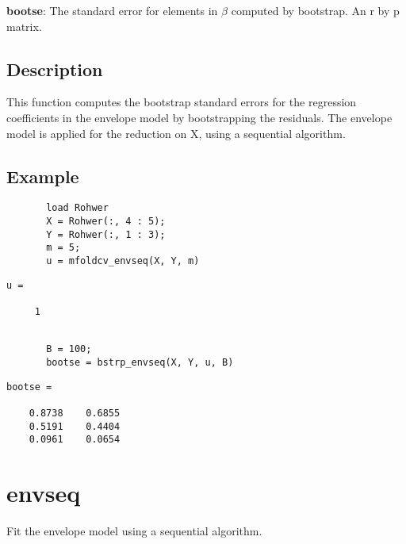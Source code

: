 \documentclass[a4paper,11pt,openany]{memoir}
\begin{document}
\begin{par}
\textbf{bootse}: The standard error for elements in $\beta$ computed by bootstrap.  An r by p matrix.
\end{par} \vspace{1em}


\subsection*{Description}

\begin{par}
This function computes the bootstrap standard errors for the regression coefficients in the envelope model by bootstrapping the residuals. The envelope model is applied for the reduction on X, using a sequential algorithm.
\end{par} \vspace{1em}


\subsection*{Example}


\begin{verbatim}       load Rohwer
       X = Rohwer(:, 4 : 5);
       Y = Rohwer(:, 1 : 3);
       m = 5;
       u = mfoldcv_envseq(X, Y, m)\end{verbatim}
               \color{lightgray} \ttfamily\begin{verbatim}
u =

     1
\end{verbatim} \rmfamily
\color{black}\begin{verbatim}
       
       B = 100;
       bootse = bstrp_envseq(X, Y, u, B)\end{verbatim}

        \color{lightgray}\ttfamily \begin{verbatim}
bootse =

    0.8738    0.6855
    0.5191    0.4404
    0.0961    0.0654

\end{verbatim} \rmfamily    
\color{black}

\newpage

\rmfamily
\color{black}\section{envseq}

\begin{par}
Fit the envelope model using a sequential algorithm.
\end{par} \vspace{1em}
\end{document}
